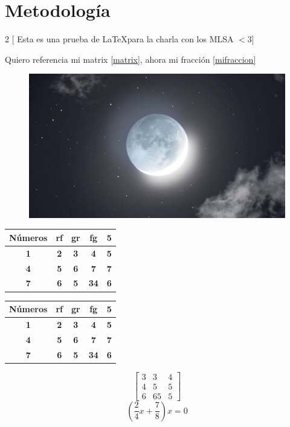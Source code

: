 \section{Metodología}
\begin{multicols}{2}
    [ Esta es una prueba de \LaTeX para la charla con los MLSA $<3$]
    \blindtext
\end{multicols}
\lipsum[1]

Quiero referencia mi matrix \ref{matrix}, ahora mi fracción \ref{mifraccion}
\begin{figure}
    \includegraphics[width=\linewidth]{build/img/luna.jpg}
\end{figure}

\begin{table}[]
    \begin{tabular}{|c|c|c|c|c|}
    \hline
    \textbf{Números} & \textbf{rf} & \textbf{gr} & \textbf{fg} & \textbf{5}  \\ \hline
    \textbf{1}       & \textbf{2}  & \textbf{3}  & \textbf{4}  & \textbf{5} \\ \hline
    \textbf{4}       & \textbf{5}  & \textbf{6}  & \textbf{7}  & \textbf{7} \\ \hline
    \textbf{7}       & \textbf{6}  & \textbf{5}  & \textbf{34} & \textbf{6} \\ \hline
    \end{tabular}
    \end{table}
    \begin{table}[]
        \begin{tabular}{|c|c|c|c|c|}
        \hline
        \textbf{Números} & \textbf{rf} & \textbf{gr} & \textbf{fg} & \textbf{5}  \\ \hline
        \textbf{1}       & \textbf{2}  & \textbf{3}  & \textbf{4}  & \textbf{5} \\ \hline
        \textbf{4}       & \textbf{5}  & \textbf{6}  & \textbf{7}  & \textbf{7} \\ \hline
        \textbf{7}       & \textbf{6}  & \textbf{5}  & \textbf{34} & \textbf{6} \\ \hline
        \end{tabular}
        \end{table}    

\begin{equation} \label{matrix}
    \begin{bmatrix}
        3&3  & 4\\ 
        4& 5 & 5\\ 
        6& 65 & 5
    \end{bmatrix}    
\end{equation}
\begin{equation} \label{mifraccion}
   \left( \frac{2}{4}x + \frac{7}{8}\right)x=0   
\end{equation}

